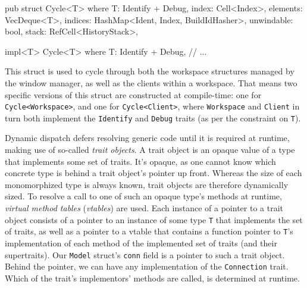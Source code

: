 \begin{rustblock}
  pub struct Cycle<T>
  where
    T: Identify + Debug,
  {
    index: Cell<Index>,
    elements: VecDeque<T>,
    indices: HashMap<Ident, Index, BuildIdHasher>,
    unwindable: bool,
    stack: RefCell<HistoryStack>,
  }

  impl<T> Cycle<T>
  where
      T: Identify + Debug,
  {
    // ...
  }
\end{rustblock}

This  struct   is  used   to  cycle  through   both  the   workspace  structures
managed   by  the   window   manager,  as   well  as   the   clients  within   a
workspace.  That means  two specific  versions  of this  struct are  constructed
at   compile-time:   one   for  \texttt{Cycle<Workspace>},   and   one
for  \texttt{Cycle<Client>},  where  \texttt{Workspace}  and
\texttt{Client} in turn both implement the \texttt{Identify}
and    \texttt{Debug}   traits    (as    per    the   constraint    on
\texttt{T}).


Dynamic  dispatch  defers  resolving  generic  code  until  it  is  required  at
runtime,  making  use   of  so-called  \textit{trait  objects}\cite{therustbook,
rustdynamicdispatch}.  A  trait  object  is  an opaque  value  of  a  type  that
implements  some  set  of  traits\cite{therustreference}. It's  opaque,  as  one
cannot  know  which  concrete  type  is  behind  a  trait  object's  pointer  up
front\cite{therustreference}.   Whereas   the   size   of   each   monomorphized
type   is    always   known,    trait   objects   are    therefore   dynamically
sized\cite{therustreference}. To resolve a call to  one of such an opaque type's
methods  at  runtime,  \textit{virtual  method  tables}  (\textit{vtables})  are
used\cite{therustreference}.  Each  instance of  a  pointer  to a  trait  object
consists of  a pointer  to an  instance of  some type  \texttt{T} that
implements the set of  traits, as well as a pointer to a  vtable that contains a
function pointer to \texttt{T}'s implementation  of each method of the
implemented set  of traits  (and their  supertraits)\cite{therustreference}. Our
\texttt{Model} struct's \texttt{conn} field  is a pointer to
such a trait object.  Behind the pointer, we can have  any implementation of the
\texttt{Connection} trait. Which of  the trait's implementors' methods
are called, is determined at runtime.

